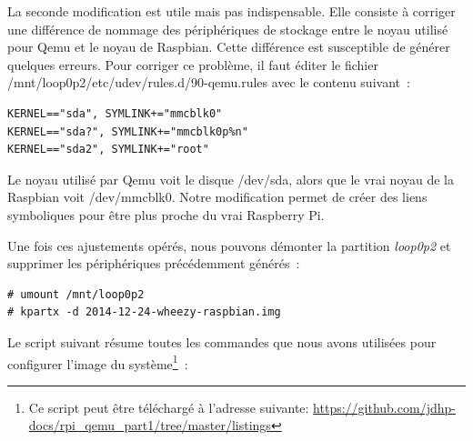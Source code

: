 \documentclass{article}
\begin{document}
La seconde modification est utile mais pas indispensable.
Elle consiste à corriger une différence de nommage des périphériques de
stockage entre le noyau utilisé pour Qemu et le noyau de Raspbian.
Cette différence est susceptible de générer quelques erreurs.
Pour corriger ce problème, il faut éditer le fichier
\og{}/mnt/loop0p2/etc/udev/rules.d/90-qemu.rules\fg{} avec le contenu suivant~:
\begin{verbatim}
KERNEL=="sda", SYMLINK+="mmcblk0"
KERNEL=="sda?", SYMLINK+="mmcblk0p%n"
KERNEL=="sda2", SYMLINK+="root"
\end{verbatim}

Le noyau utilisé par Qemu voit le disque \og{}/dev/sda\fg{}, alors que le
\og{}vrai\fg{} noyau de la Raspbian voit \og{}/dev/mmcblk0\fg{}.
Notre modification permet de créer des liens symboliques pour être plus
proche du vrai Raspberry Pi.

Une fois ces ajustements opérés, nous pouvons démonter la partition {\em
loop0p2} et supprimer les périphériques précédemment générés~:
\begin{verbatim}
# umount /mnt/loop0p2
# kpartx -d 2014-12-24-wheezy-raspbian.img
\end{verbatim}

Le script suivant résume toutes les commandes que nous avons utilisées pour
configurer l'image du système\footnote{Ce script peut être téléchargé à
l'adresse suivante:
\url{https://github.com/jdhp-docs/rpi_qemu_part1/tree/master/listings}}~:

\begin{small}
    
\end{small}


\end{document}

